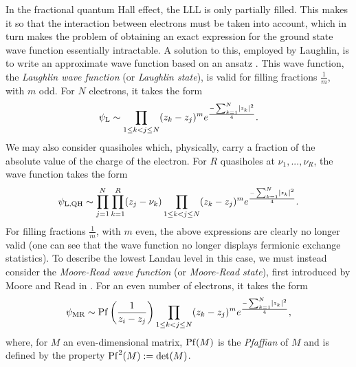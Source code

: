 \documentclass[notas.tex]{subfiles}
\begin{document}
In the fractional quantum Hall effect, the LLL is only partially filled. This makes it so that the interaction between electrons must be taken into account, which in turn makes the problem of obtaining an exact expression for the ground state wave function essentially intractable. A solution to this, employed by Laughlin, is to write an approximate wave function based on an ansatz \cite{laughlin_anomalous_1983}. This wave function, the \emph{Laughlin wave function} (or \emph{Laughlin state}), is valid for filling fractions $\frac{1}{m}$, with $m$ odd. For $N$ electrons, it takes the form
\begin{align} \label{eq_laughlin_wavefunction}
	\psi_\text{L} \sim \prod_{1 \leq k < j \leq N}(z_k - z_j)^m e^{\frac{-\sum_{k=1}^N \left|z_k\right|^2}{4}}.
\end{align}
We may also consider quasiholes which, physically, carry a fraction of the absolute value of the charge of the electron. For $R$ quasiholes at $\nu_1,...,\nu_R$, the wave function takes the form
\begin{align} \label{eq_laughlin_wavefunction_qh}
	\psi_\text{L,QH} \sim \prod_{j = 1}^{N}\prod_{k = 1}^{R}(z_j - \nu_k) \prod_{1 \leq k < j \leq N}(z_k - z_j)^m e^{\frac{-\sum_{k=1}^N \left|z_k\right|^2}{4}}.
\end{align}
For filling fractions $\frac{1}{m}$, with $m$ even, the above expressions are clearly no longer valid (one can see that the wave function no longer displays fermionic exchange statistics). To describe the lowest Landau level in this case, we must instead consider the \emph{Moore-Read wave function} (or \emph{Moore-Read state}), first introduced by Moore and Read in \cite{moore_nonabelions_1991}. For an even number of electrons, it takes the form
\begin{align}\label{eq_mr_wavefunction}
	\psi_{\text{MR}} \sim \operatorname{Pf}\left ( \frac{1}{z_i - z_j} \right ) \prod_{1 \leq k < j \leq N}(z_k - z_j)^m e^{\frac{-\sum_{k=1}^N \left|z_k\right|^2}{4}},
\end{align}
where, for $M$ an even-dimensional matrix, $\operatorname{Pf}(M)$ is the \emph{Pfaffian} of $M$ and is defined by the property $\operatorname{Pf}^2(M) := \det(M)$. 
\end{document}
